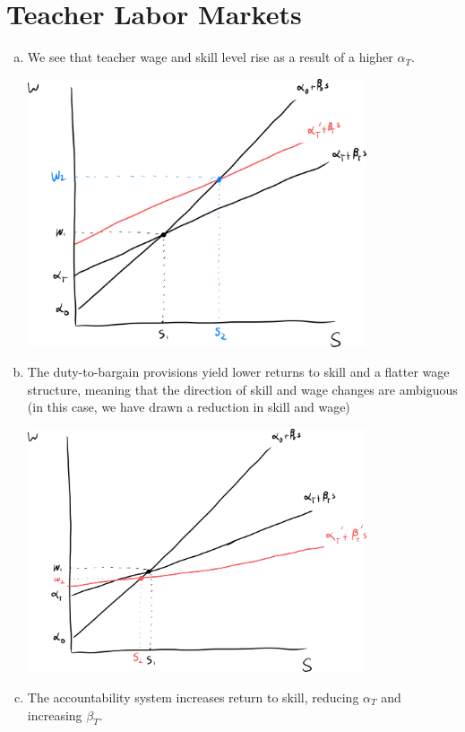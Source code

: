 \documentclass[12pt]{extarticle}
\begin{document}
  \section{Teacher Labor Markets}%
  \begin{enumerate}[(a)]
    \item We see that teacher wage and skill level rise as a result of a higher $\alpha_T$.
      \begin{center}
        \includegraphics[width=10cm]{images/ps3q3a.png}
      \end{center}
    \item The duty-to-bargain provisions yield lower returns to skill and a flatter wage structure, meaning that the direction of skill and wage changes are ambiguous (in this case, we have drawn a reduction in skill and wage)
      \begin{center}
        \includegraphics[width=10cm]{images/ps3q3b.png}
      \end{center}
    \item The accountability system increases return to skill, reducing $\alpha_T$ and increasing $\beta_T$.

\end{enumerate}
\end{document}
